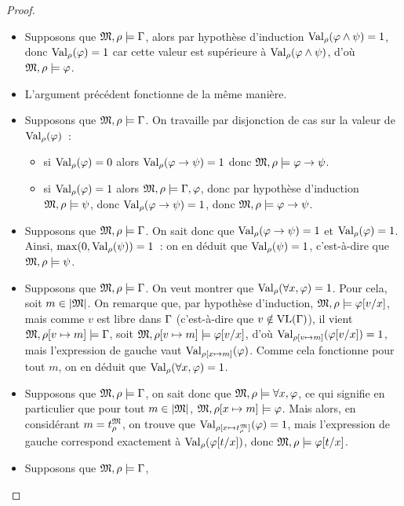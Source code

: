 \begin{proof}
\begin{itemize}
    $\satMI \varFF\land \varFP$.
  \item[$\RandEG$~:] Supposons que
    $\mathfrak{M},\rho\models\Gamma$, alors par hypothèse d'induction
    $\operatorname{Val}_{\rho}(\varphi\land \psi) = 1$, donc $\operatorname{Val}_{\rho}(\varphi) = 1$ car cette valeur
    est
    supérieure à $\operatorname{Val}_{\rho}(\varphi\land \psi)$, d'où $\mathfrak{M},\rho\models \varphi$.
  \item[$\RandED$~:] L'argument précédent fonctionne de la même
    manière.
  \item[$\RtoI$~:] Supposons que $\mathfrak{M},\rho\models\Gamma$. On
    travaille par disjonction de cas sur la valeur de $\operatorname{Val}_{\rho}(\varphi)$~:
    \begin{itemize}
    \item si $\operatorname{Val}_{\rho}(\varphi) = 0$ alors $\operatorname{Val}_{\rho}(\varphi\to \psi) = 1$ donc
      $\mathfrak{M},\rho\models \varphi \to \psi$.
    \item si $\operatorname{Val}_{\rho}(\varphi) = 1$ alors
      $\mathfrak{M},\rho\models \Gamma,\varphi$,
      donc par hypothèse d'induction $\mathfrak{M},\rho\models\psi$, donc
      $\operatorname{Val}_{\rho}(\varphi\to \psi) = 1$, donc $\mathfrak{M},\rho\models \varphi \to \psi$.
    \end{itemize}
  \item[$\RtoE$~:] Supposons que $\mathfrak{M},\rho\models\Gamma$. On sait
    donc que $\operatorname{Val}_{\rho}(\varphi\to \psi) = 1$ et $\operatorname{Val}_{\rho}(\varphi) = 1$. Ainsi,
    $\max(0,\operatorname{Val}_{\rho}(\psi)) = 1$~: on en déduit que $\operatorname{Val}_{\rho}(\psi) = 1$,
    c'est-à-dire que $\mathfrak{M},\rho\models \psi$.
  \item[$\RforaI$~:] Supposons que $\mathfrak{M},\rho\models\Gamma$.
    On veut montrer que $\operatorname{Val}_{\rho}(\forall x, \varphi) = 1$. Pour cela, soit
    $m \in \left\vert \mathfrak{M}\right\vert$. On remarque que, par hypothèse d'induction,
    $\mathfrak{M},\rho\models \varphi[v/x]$, mais comme $v$ est libre dans $\Gamma$
    (c'est-à-dire que $v\notin\operatorname{VL}(\Gamma)$), il vient
    $\mathfrak{M},\rho[v\mapsto m]\models\Gamma$, soit
    $\mathfrak{M},\rho[v\mapsto m]\models \varphi[v/x]$, d'où
    $\operatorname{Val}_{\rho[v\mapsto m]}(\varphi[v/x]) = 1$, mais l'expression de gauche vaut
    $\operatorname{Val}_{\rho[x\mapsto m]}(\varphi)$.
    Comme cela fonctionne pour tout $m$, on en déduit que
    $\operatorname{Val}_{\rho}(\forall x, \varphi) = 1$.
  \item[$\RforaE$~:] Supposons que $\mathfrak{M},\rho\models \Gamma$, on
    sait donc que $\mathfrak{M},\rho\models\forall x, \varphi$, ce qui signifie en
    particulier que pour tout $m\in\left\vert \mathfrak{M}\right\vert$,
    $\mathfrak{M},\rho[x\mapsto m]\models \varphi$.
    Mais alors, en considérant $m = t^{\mathfrak{M}}_{\rho}$, on trouve que
    $\operatorname{Val}_{\rho[x\mapsto t^{\mathfrak{M}}_{\rho}]}(\varphi) = 1$, mais l'expression de gauche
    correspond exactement à $\operatorname{Val}_{\rho}(\varphi[t/x])$, donc
    $\mathfrak{M},\rho\models \varphi[t/x]$.
  \item[$\RexI$~:] Supposons que $\mathfrak{M},\rho\models\Gamma$,

\end{itemize}
\end{proof}
